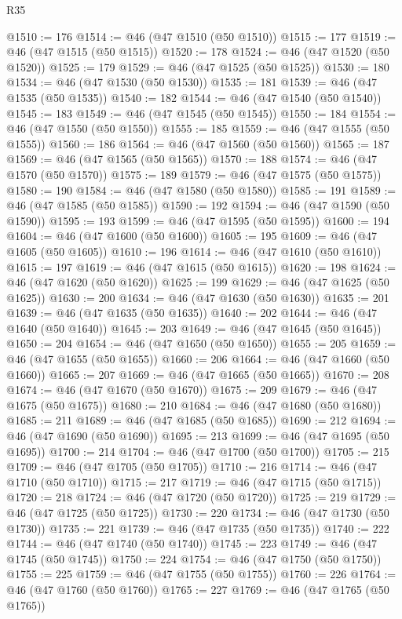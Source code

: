 \begin{lexlean}{R35}
\begin{coremodule}
@1510 := 176
@1514 := @46 (@47 @1510 (@50 @1510))
@1515 := 177
@1519 := @46 (@47 @1515 (@50 @1515))
@1520 := 178
@1524 := @46 (@47 @1520 (@50 @1520))
@1525 := 179
@1529 := @46 (@47 @1525 (@50 @1525))
@1530 := 180
@1534 := @46 (@47 @1530 (@50 @1530))
@1535 := 181
@1539 := @46 (@47 @1535 (@50 @1535))
@1540 := 182
@1544 := @46 (@47 @1540 (@50 @1540))
@1545 := 183
@1549 := @46 (@47 @1545 (@50 @1545))
@1550 := 184
@1554 := @46 (@47 @1550 (@50 @1550))
@1555 := 185
@1559 := @46 (@47 @1555 (@50 @1555))
@1560 := 186
@1564 := @46 (@47 @1560 (@50 @1560))
@1565 := 187
@1569 := @46 (@47 @1565 (@50 @1565))
@1570 := 188
@1574 := @46 (@47 @1570 (@50 @1570))
@1575 := 189
@1579 := @46 (@47 @1575 (@50 @1575))
@1580 := 190
@1584 := @46 (@47 @1580 (@50 @1580))
@1585 := 191
@1589 := @46 (@47 @1585 (@50 @1585))
@1590 := 192
@1594 := @46 (@47 @1590 (@50 @1590))
@1595 := 193
@1599 := @46 (@47 @1595 (@50 @1595))
@1600 := 194
@1604 := @46 (@47 @1600 (@50 @1600))
@1605 := 195
@1609 := @46 (@47 @1605 (@50 @1605))
@1610 := 196
@1614 := @46 (@47 @1610 (@50 @1610))
@1615 := 197
@1619 := @46 (@47 @1615 (@50 @1615))
@1620 := 198
@1624 := @46 (@47 @1620 (@50 @1620))
@1625 := 199
@1629 := @46 (@47 @1625 (@50 @1625))
@1630 := 200
@1634 := @46 (@47 @1630 (@50 @1630))
@1635 := 201
@1639 := @46 (@47 @1635 (@50 @1635))
@1640 := 202
@1644 := @46 (@47 @1640 (@50 @1640))
@1645 := 203
@1649 := @46 (@47 @1645 (@50 @1645))
@1650 := 204
@1654 := @46 (@47 @1650 (@50 @1650))
@1655 := 205
@1659 := @46 (@47 @1655 (@50 @1655))
@1660 := 206
@1664 := @46 (@47 @1660 (@50 @1660))
@1665 := 207
@1669 := @46 (@47 @1665 (@50 @1665))
@1670 := 208
@1674 := @46 (@47 @1670 (@50 @1670))
@1675 := 209
@1679 := @46 (@47 @1675 (@50 @1675))
@1680 := 210
@1684 := @46 (@47 @1680 (@50 @1680))
@1685 := 211
@1689 := @46 (@47 @1685 (@50 @1685))
@1690 := 212
@1694 := @46 (@47 @1690 (@50 @1690))
@1695 := 213
@1699 := @46 (@47 @1695 (@50 @1695))
@1700 := 214
@1704 := @46 (@47 @1700 (@50 @1700))
@1705 := 215
@1709 := @46 (@47 @1705 (@50 @1705))
@1710 := 216
@1714 := @46 (@47 @1710 (@50 @1710))
@1715 := 217
@1719 := @46 (@47 @1715 (@50 @1715))
@1720 := 218
@1724 := @46 (@47 @1720 (@50 @1720))
@1725 := 219
@1729 := @46 (@47 @1725 (@50 @1725))
@1730 := 220
@1734 := @46 (@47 @1730 (@50 @1730))
@1735 := 221
@1739 := @46 (@47 @1735 (@50 @1735))
@1740 := 222
@1744 := @46 (@47 @1740 (@50 @1740))
@1745 := 223
@1749 := @46 (@47 @1745 (@50 @1745))
@1750 := 224
@1754 := @46 (@47 @1750 (@50 @1750))
@1755 := 225
@1759 := @46 (@47 @1755 (@50 @1755))
@1760 := 226
@1764 := @46 (@47 @1760 (@50 @1760))
@1765 := 227
@1769 := @46 (@47 @1765 (@50 @1765))

\end{coremodule}
\end{lexlean}
